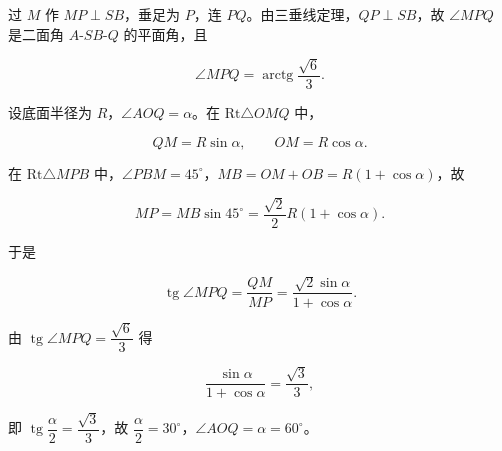 \begin{answer}
过 $M$ 作 $MP\perp SB$，垂足为 $P$，连 $PQ$。由三垂线定理，$QP\perp SB$，故 $\angle MPQ$ 是二面角 $A\text{-}SB\text{-}Q$ 的平面角，且

\nopagebreak[4]
\[
\angle MPQ=\operatorname{arctg}\frac{\sqrt{6}}{3}.
\]

设底面半径为 $R$，$\angle AOQ=\alpha$。在 $\mathrm{Rt}\triangle OMQ$ 中，

\nopagebreak[4]
\[
QM=R\sin\alpha,\qquad OM=R\cos\alpha.
\]

在 $\mathrm{Rt}\triangle MPB$ 中，$\angle PBM=45^{\circ}$，$MB=OM+OB=R(1+\cos\alpha)$，故

\nopagebreak[4]
\[
MP=MB\sin 45^{\circ}=\frac{\sqrt{2}}{2}R(1+\cos\alpha).
\]

于是

\nopagebreak[4]
\[
\operatorname{tg}\angle MPQ=\frac{QM}{MP}=\frac{\sqrt{2}\sin\alpha}{1+\cos\alpha}.
\]

由 $\operatorname{tg}\angle MPQ=\dfrac{\sqrt{6}}{3}$ 得

\nopagebreak[4]
\[
\frac{\sin\alpha}{1+\cos\alpha}=\frac{\sqrt{3}}{3},
\]

即 $\operatorname{tg}\dfrac{\alpha}{2}=\dfrac{\sqrt{3}}{3}$，故 $\dfrac{\alpha}{2}=30^{\circ}$，$\angle AOQ=\alpha=60^{\circ}$。


\end{answer}
